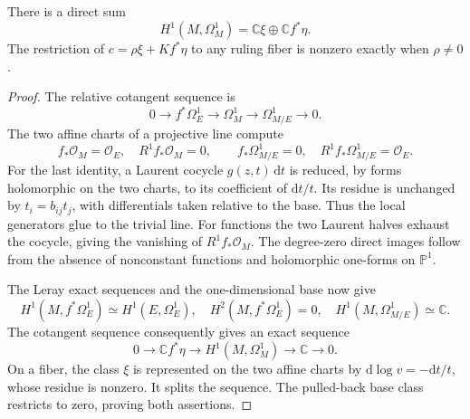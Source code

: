 \begin{lemma}\label{lem:split-elliptic-cotangent-cohomology}
There is a direct sum
\[
 H^1(M,\Omega_M^1)=\mathbb C\xi\oplus\mathbb C f^*\eta.
\]
The restriction of $c=\rho\xi+Kf^*\eta$ to any ruling fiber is nonzero exactly when $\rho\ne0$.
\end{lemma}
\begin{proof}
The relative cotangent sequence is
\[
 0\longrightarrow f^*\Omega_E^1\longrightarrow\Omega_M^1
      \longrightarrow\Omega_{M/E}^1\longrightarrow0.
\]
The two affine charts of a projective line compute
\[
 f_*\mathcal O_M=\mathcal O_E,\quad R^1f_*\mathcal O_M=0,
 \qquad f_*\Omega_{M/E}^1=0,\quad
 R^1f_*\Omega_{M/E}^1=\mathcal O_E.
\]
For the last identity, a Laurent cocycle $g(z,t)\,\mathrm{d}t$ is reduced, by forms holomorphic on the two charts, to its coefficient of $\mathrm{d}t/t$. Its residue is unchanged by $t_i=b_{ij}t_j$, with differentials taken relative to the base. Thus the local generators glue to the trivial line. For functions the two Laurent halves exhaust the cocycle, giving the vanishing of $R^1f_*\mathcal O_M$. The degree-zero direct images follow from the absence of nonconstant functions and holomorphic one-forms on $\mathbb P^1$.

The Leray exact sequences and the one-dimensional base now give
\[
 H^1(M,f^*\Omega_E^1)\simeq H^1(E,\Omega_E^1),\quad
 H^2(M,f^*\Omega_E^1)=0,\quad
 H^1(M,\Omega_{M/E}^1)\simeq\mathbb C.
\]
The cotangent sequence consequently gives an exact sequence
\[
 0\longrightarrow\mathbb C f^*\eta
 \longrightarrow H^1(M,\Omega_M^1)\longrightarrow\mathbb C\longrightarrow0.
\]
On a fiber, the class $\xi$ is represented on the two affine charts by $\mathrm{d}\log v=-\mathrm{d}t/t$, whose residue is nonzero. It splits the sequence. The pulled-back base class restricts to zero, proving both assertions.
\end{proof}

